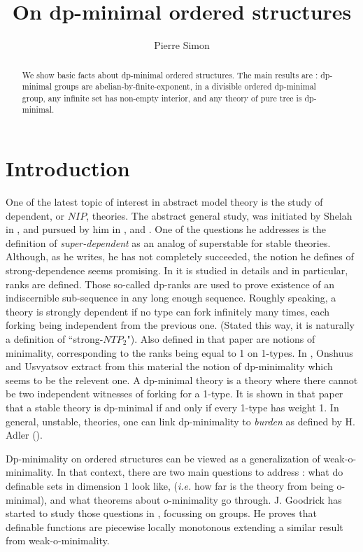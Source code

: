 \documentclass[english]{article}
\title{On dp-minimal ordered structures}
\author{Pierre Simon}
\theoremstyle{definition}
\theoremstyle{mystyle}
\theoremstyle{remark}
\begin{document}
\maketitle
\begin{abstract}
We show basic facts about dp-minimal ordered structures. The main results are : dp-minimal groups are abelian-by-finite-exponent, in a divisible ordered dp-minimal group, any infinite set has non-empty interior, and any theory of pure tree is dp-minimal.
\end{abstract}

\section*{Introduction}

One of the latest topic of interest in abstract model theory is the study of dependent, or $NIP$, theories. The abstract general study, was initiated by Shelah in \cite{Sh715}, and pursued by him in \cite{Sh783}, \cite{Sh863} and \cite{Sh900}. One of the questions he addresses is the definition of \emph{super-dependent} as an analog of superstable for stable theories. Although, as he writes, he has not completely succeeded, the notion he defines of strong-dependence seems promising. In \cite{Sh863} it is studied in details and in particular, ranks are defined. Those so-called dp-ranks are used to prove existence of an indiscernible sub-sequence in any long enough sequence. Roughly speaking, a theory is strongly dependent if no type can fork infinitely many times, each forking being independent from the previous one. (Stated this way, it is naturally a definition of ``strong-$NTP_2$"). Also defined in that paper are notions of minimality, corresponding to the ranks being equal to 1 on 1-types. In \cite{Ons}, Onshuus and Usvyatsov extract from this material the notion of dp-minimality which seems to be the relevent one. A dp-minimal theory is a theory where there cannot be two independent witnesses of forking for a 1-type. It is shown in that paper that a stable theory is dp-minimal if and only if every 1-type has weight 1. In general, unstable, theories, one can link dp-minimality to \emph{burden} as defined by H. Adler (\cite{burden}).

Dp-minimality on ordered structures can be viewed as a generalization of weak-o-minimality. In that context, there are two main questions to address : what do definable sets in dimension 1 look like, ({\it i.e.} how far is the theory from being o-minimal), and what theorems about o-minimality go through. J. Goodrick has started to study those questions in \cite{Good}, focussing on groups. He proves that definable functions are piecewise locally monotonous extending a similar result from weak-o-minimality.
\\
\end{document}
